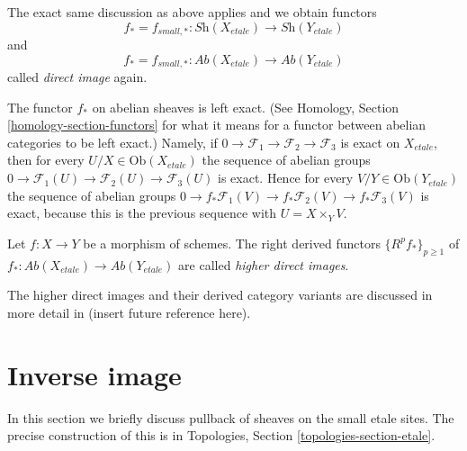 \noindent
The exact same discussion as above applies and we obtain functors
$$
f_* = f_{small, *} :
\textit{Sh}(X_{etale})
\longrightarrow
\textit{Sh}(Y_{etale})
$$
and
$$
f_* = f_{small, *} :
\textit{Ab}(X_{etale})
\longrightarrow
\textit{Ab}(Y_{etale})
$$
called {\it direct image} again.

\medskip\noindent
The functor $f_*$ on abelian sheaves is left exact. (See
Homology, Section \ref{homology-section-functors}
for what it means for a functor between abelian categories to be left exact.)
Namely, if
$0 \to \mathcal{F}_1 \to \mathcal{F}_2 \to \mathcal{F}_3$
is exact on $X_{etale}$, then for every $U/X \in \text{Ob}(X_{etale})$
the sequence of abelian groups
$0 \to \mathcal{F}_1(U) \to \mathcal{F}_2(U) \to \mathcal{F}_3(U)$
is exact. Hence for every $V/Y \in \text{Ob}(Y_{etale})$
the sequence of abelian groups
$0 \to f_*\mathcal{F}_1(V) \to f_*\mathcal{F}_2(V) \to f_*\mathcal{F}_3(V)$
is exact, because this is the previous sequence with $U = X \times_Y V$. 

\begin{definition}
\label{definition-higher-direct-images}
Let $f: X \to Y$ be a morphism of schemes.
The right derived functors $\{R^pf_*\}_{p \geq 1}$ of
$f_* : \textit{Ab}(X_{etale}) \to \textit{Ab}(Y_{etale})$
are called {\it higher direct images}.
\end{definition}

\noindent
The higher direct images and their derived category variants are
discussed in more detail in (insert future reference here).



\section{Inverse image}
\label{section-inverse-image}

\noindent
In this section we briefly discuss pullback of sheaves on the small
etale sites. The precise construction of this is in
Topologies, Section \ref{topologies-section-etale}.

